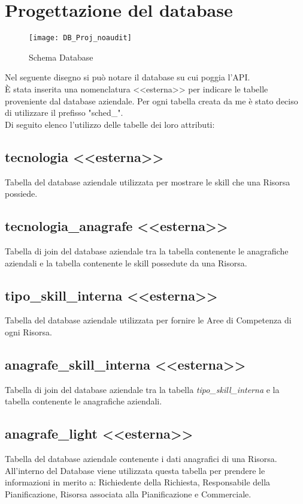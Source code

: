 \section{Progettazione del database}
\begin{figure}[H] 
    \centering 
    \texttt{[image: DB\_Proj\_noaudit]} 
    \caption{Schema Database}
\end{figure}
\noindent Nel seguente disegno si può notare il database su cui poggia l'API.\\
È stata inserita una nomenclatura <<esterna>> per indicare le tabelle proveniente dal database aziendale. Per ogni tabella creata da me è stato deciso di utilizzare il prefisso "sched\_".\\
Di seguito elenco l'utilizzo delle tabelle dei loro attributi:

\subsection*{tecnologia <<esterna>>}
Tabella del database aziendale utilizzata per mostrare le skill che una Risorsa possiede.
\subsection*{tecnologia\_anagrafe <<esterna>>}
Tabella di join del database aziendale tra la tabella contenente le anagrafiche aziendali e la tabella contenente le skill possedute da una Risorsa.
\subsection*{tipo\_skill\_interna <<esterna>>}
Tabella del database aziendale utilizzata per fornire le Aree di Competenza di ogni Risorsa.
\subsection*{anagrafe\_skill\_interna <<esterna>>}
Tabella di join del database aziendale tra la tabella \textit{tipo\_skill\_interna} e la tabella contenente le anagrafiche aziendali.
\subsection*{anagrafe\_light <<esterna>>} 
Tabella del database aziendale contenente i dati anagrafici di una Risorsa. All'interno del Database viene utilizzata questa tabella per prendere le informazioni in merito a: Richiedente della Richiesta, Responsabile della Pianificazione, Risorsa associata alla Pianificazione e Commerciale.
